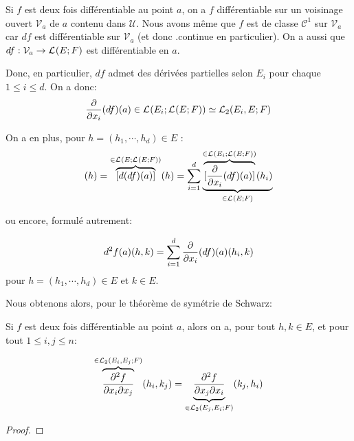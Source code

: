 \begin{remarque}
	Si $f$ est deux fois différentiable au point $a$, on a $f$ différentiable
	sur un voisinage ouvert $\mathcal{V}_{a}$ de $a$ contenu dans $\mathcal{U}$.
	Nous avons même que $f$ est de classe $\mathcal{C}^{1}$ sur
	$\mathcal{V}_{a}$ car $df$ est différentiable sur $\mathcal{V}_{a}$ (et donc
	.continue en particulier).
	On a aussi que $df : \mathcal{V}_{a} \rightarrow \GScontinueHomo{E}{F}$ est
	différentiable en $a$.

	Donc, en particulier, $df$ admet des dérivées partielles selon $E_{i}$ pour
	chaque $1 \leq i \leq d$.
	On a donc:
	\begin{equation*}
		\pdv{x_{i}} (df)(a) \in \GScontinueHomo{E_{i}}{\GScontinueHomo{E}{F}}
		\identification \GScontinueHomo[2]{E_{i}, E}{F}
	\end{equation*}

	On a en plus, pour $h = (h_{1}, \cdots, h_{d}) \in E$ :
	\begin{equation*}
		[d^{2}f(a)](h) = \overbrace{[d(df)(a)]}^{\in \GScontinueHomo{E}{\GScontinueHomo{E}{F}}} (h) = \displaystyle \sum_{i = 1}^{d} \underbrace{\overbrace{[\pdv{x_{i}}
		(df)(a)]}^{\in \GScontinueHomo{E_{i}}{\GScontinueHomo{E}{F}}}
		(h_{i})}_{\in \GScontinueHomo{E}{F}}
	\end{equation*}

	ou encore, formulé autrement:

	\begin{equation*}
		d^{2}f(a)(h, k) = \displaystyle \sum_{i = 1}^{d} \pdv{x_{i}}
		(df)(a)(h_{i}, k)
	\end{equation*}
	pour $h = (h_{1}, \cdots, h_{d}) \in E$ et $k \in E$.

\end{remarque}
Nous obtenons alors, pour le théorème de symétrie de Schwarz:

\begin{theorem}
	Si $f$ est deux fois différentiable au point $a$, alors on a, pour tout $h,
	k \in E$, et pour tout $1 \leq i, j \leq n$:

	\begin{equation}
		\overbrace{\pdv{f}{x_{i}}{x_{j}} (a)}^{\in \GScontinueHomo[2]{E_{i},
		E_{j}}{F}} (h_{i}, k_{j}) = \underbrace{\pdv{f}{x_{j}}{x_{i}} (a)}_{\in
			\GScontinueHomo[2]{E_{j}, E_{i}}{F}}
		(k_{j}, h_{i})
	\end{equation}
\end{theorem}

\ifdefined\outputproof
\begin{proof}

\end{proof}
\fi

